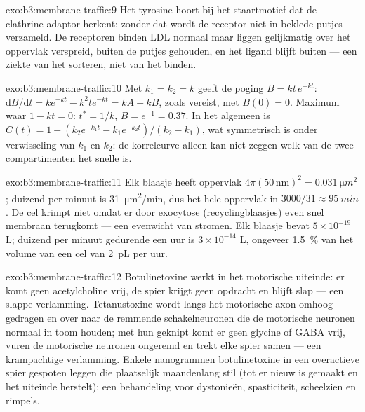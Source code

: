\begin{solution}{exo:b3:membrane-traffic:9}
Het tyrosine hoort bij het staartmotief dat de clathrine-adaptor
herkent; zonder dat  wordt de receptor niet in beklede putjes
verzameld. De receptoren binden LDL normaal maar liggen gelijkmatig
over het oppervlak verspreid, buiten de putjes gehouden, en het ligand
blijft buiten --- een ziekte van het sorteren, niet van het binden.
\end{solution}

\begin{solution}{exo:b3:membrane-traffic:10}
Met $k_{1} = k_{2} = k$ geeft de poging $B = kt\,e^{-kt}$:
$\mathrm{d}B/\mathrm{d}t
= k e^{-kt} - k^{2}t e^{-kt} = kA - kB$, zoals vereist, met $B(0) = 0$.
Maximum waar $1 - kt = 0$: $t^{*} = 1/k$, $B = e^{-1} = 0.37$. In het
algemeen is
$C(t) = 1 - (k_{2}e^{-k_{1}t} - k_{1}e^{-k_{2}t})/(k_{2} - k_{1})$,
wat symmetrisch is onder verwisseling van $k_{1}$ en $k_{2}$: de
korrelcurve alleen kan niet zeggen welk van de twee compartimenten het
snelle is.
\end{solution}

\begin{solution}{exo:b3:membrane-traffic:11}
Elk blaasje heeft oppervlak $4\pi(50\,\text{nm})^{2} = \qty{0.031}{\micro
m^2}$; duizend per minuut is \qty{31}{\micro m^2/min}, dus het hele
oppervlak in $3000/31 \approx \qty{95}{min}$. De cel krimpt niet omdat
er door exocytose (recyclingblaasjes) even snel membraan terugkomt ---
een evenwicht van stromen. Elk blaasje bevat $5\times 10^{-19}$ L;
duizend per minuut gedurende een uur is $3\times 10^{-14}$ L, ongeveer
\qty{1.5}{\%} van het volume van een cel van \qty{2}{pL} per uur.
\end{solution}

\begin{solution}{exo:b3:membrane-traffic:12}
Botulinetoxine werkt in het motorische uiteinde: er komt geen
acetylcholine vrij, de spier krijgt geen opdracht en blijft slap ---
een slappe verlamming. Tetanustoxine wordt langs het motorische axon
omhoog gedragen en over naar de remmende schakelneuronen die de
motorische neuronen normaal in toom houden; met hun  geknipt komt
er geen glycine of GABA vrij, vuren de motorische neuronen
ongeremd en trekt elke spier samen --- een krampachtige verlamming.
Enkele nanogrammen botulinetoxine in een overactieve spier gespoten
leggen die plaatselijk maandenlang stil (tot er nieuw  is gemaakt
en het uiteinde herstelt): een behandeling voor dystonieën,
spasticiteit, scheelzien en rimpels.
\end{solution}

